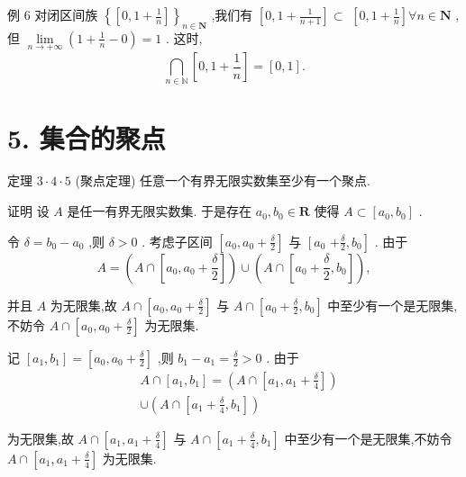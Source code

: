 例 6 对闭区间族 ${\left\{  \left\lbrack  0,1 + \frac{1}{n}\right\rbrack  \right\}  }_{n \in  \mathbf{N}}$ ,我们有 $\left\lbrack  {0,1 + \frac{1}{n + 1}}\right\rbrack   \subset$  $\left\lbrack  {0,1 + \frac{1}{n}}\right\rbrack  \forall n \in  \mathbf{N}$ ,但 $\mathop{\lim }\limits_{{n \rightarrow   + \infty }}\left( {1 + \frac{1}{n} - 0}\right)  = 1$ . 这时,
$$\mathop{\bigcap }\limits_{{n \in  \mathbb{N}}}\left\lbrack  {0,1 + \frac{1}{n}}\right\rbrack   = \left\lbrack  {0,1}\right\rbrack  .$$

\section*{5. 集合的聚点}

定理 $3 \cdot  4 \cdot  5$ (聚点定理) 任意一个有界无限实数集至少有一个聚点.

证明 设 $A$ 是任一有界无限实数集. 于是存在 ${a}_{0},{b}_{0} \in  \mathbf{R}$ 使得 $A \subset  \left\lbrack  {{a}_{0},{b}_{0}}\right\rbrack$ .

令 $\delta  = {b}_{0} - {a}_{0}$ ,则 $\delta  > 0$ . 考虑子区间 $\left\lbrack  {{a}_{0},{a}_{0} + \frac{\delta }{2}}\right\rbrack$ 与 $\left\lbrack  {a}_{0}\right.$  $\left. {+\frac{\delta }{2},{b}_{0}}\right\rbrack$ . 由于
$$A = \left( {A \cap  \left\lbrack  {{a}_{0},{a}_{0} + \frac{\delta }{2}}\right\rbrack  }\right)  \cup  \left( {A \cap  \left\lbrack  {{a}_{0} + \frac{\delta }{2},{b}_{0}}\right\rbrack  }\right) ,$$

并且 $A$ 为无限集,故 $A \cap  \left\lbrack  {{a}_{0},{a}_{0} + \frac{\delta }{2}}\right\rbrack$ 与 $A \cap  \left\lbrack  {{a}_{0} + \frac{\delta }{2},{b}_{0}}\right\rbrack$ 中至少有一个是无限集,不妨令 $A \cap  \left\lbrack  {{a}_{0},{a}_{0} + \frac{\delta }{2}}\right\rbrack$ 为无限集.

记 $\left\lbrack  {{a}_{1},{b}_{1}}\right\rbrack   = \left\lbrack  {{a}_{0},{a}_{0} + \frac{\delta }{2}}\right\rbrack$ ,则 ${b}_{1} - {a}_{1} = \frac{\delta }{2} > 0$ . 由于
\begin{align*}
	&A \cap  \left\lbrack  {{a}_{1},{b}_{1}}\right\rbrack   = \left( {A \cap  \left\lbrack  {{a}_{1},{a}_{1} + \frac{\delta }{4}}\right\rbrack  }\right)\\
	&\cup  \left( {A \cap  \left\lbrack  {{a}_{1} + \frac{\delta }{4},{b}_{1}}\right\rbrack  }\right)
\end{align*}

为无限集,故 $A \cap  \left\lbrack  {{a}_{1},{a}_{1} + \frac{\delta }{4}}\right\rbrack$ 与 $A \cap  \left\lbrack  {{a}_{1} + \frac{\delta }{4},{b}_{1}}\right\rbrack$ 中至少有一个是无限集,不妨令 $A \cap  \left\lbrack  {{a}_{1},{a}_{1} + \frac{\delta }{4}}\right\rbrack$ 为无限集.

